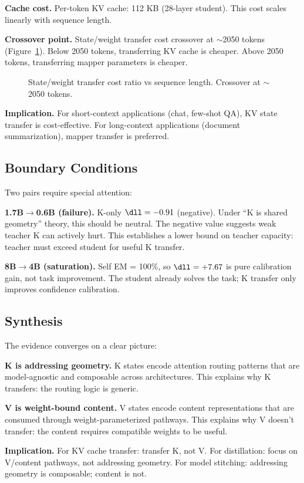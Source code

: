 \textbf{Cache cost.}
Per-token KV cache: 112 KB (28-layer student).
This cost scales linearly with sequence length.

\textbf{Crossover point.}
State/weight transfer cost crossover at $\sim$2050 tokens (Figure~\ref{fig:cost}).
Below 2050 tokens, transferring KV cache is cheaper.
Above 2050 tokens, transferring mapper parameters is cheaper.

\begin{figure}[t]
\centering
\caption{State/weight transfer cost ratio vs sequence length.
Crossover at $\sim$2050 tokens.}
\label{fig:cost}
\end{figure}

\textbf{Implication.}
For short-context applications (chat, few-shot QA),
KV state transfer is cost-effective.
For long-context applications (document summarization),
mapper transfer is preferred.

\subsection{Boundary Conditions}

Two pairs require special attention:

\textbf{1.7B$\to$0.6B (failure).}
K-only $\dll = -0.91$ (negative).
Under ``K is shared geometry'' theory, this should be neutral.
The negative value suggests weak teacher K can actively hurt.
This establishes a lower bound on teacher capacity:
teacher must exceed student for useful K transfer.

\textbf{8B$\to$4B (saturation).}
Self EM = 100\%, so $\dll = +7.67$ is pure calibration gain,
not task improvement.
The student already solves the task; K transfer only
improves confidence calibration.

\subsection{Synthesis}

The evidence converges on a clear picture:

\textbf{K is addressing geometry.}
K states encode attention routing patterns that are
model-agnostic and composable across architectures.
This explains why K transfers: the routing logic is generic.

\textbf{V is weight-bound content.}
V states encode content representations that are
consumed through weight-parameterized pathways.
This explains why V doesn't transfer: the content requires
compatible weights to be useful.

\textbf{Implication.}
For KV cache transfer:
transfer K, not V.
For distillation:
focus on V/content pathways, not addressing geometry.
For model stitching:
addressing geometry is composable; content is not.
